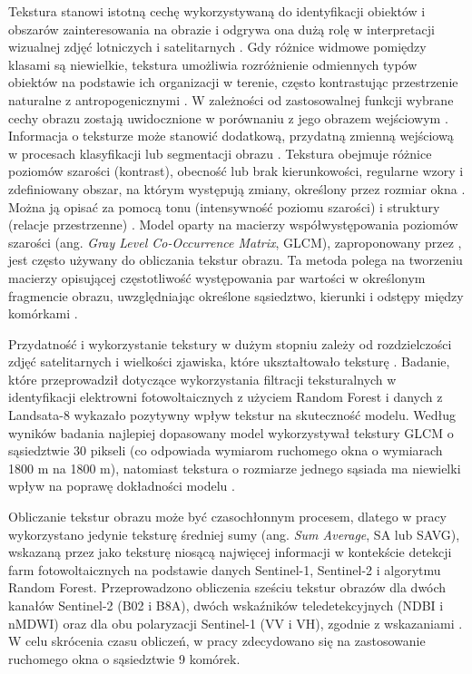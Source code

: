 \documentclass{amuthesis}
\begin{document}
Tekstura stanowi istotną cechę wykorzystywaną do identyfikacji obiektów
i obszarów zainteresowania na obrazie \autocite{haralick_1973_texture} i
odgrywa ona dużą rolę w interpretacji wizualnej zdjęć lotniczych i
satelitarnych \autocite{lewinski_2012_texture}. Gdy różnice widmowe
pomiędzy klasami są niewielkie, tekstura umożliwia rozróżnienie
odmiennych typów obiektów na podstawie ich organizacji w terenie, często
kontrastując przestrzenie naturalne z antropogenicznymi
\autocite{grass_r_texture}. W zależności od zastosowalnej funkcji
wybrane cechy obrazu zostają uwidocznione w porównaniu z jego obrazem
wejściowym \autocite{lewinski_2012_texture}. Informacja o teksturze może
stanowić dodatkową, przydatną zmienną wejściową w procesach klasyfikacji
lub segmentacji obrazu
\autocite{gong_1992_spatial_features,mumby_2002_ikonos}. Tekstura
obejmuje różnice poziomów szarości (kontrast), obecność lub brak
kierunkowości, regularne wzory i zdefiniowany obszar, na którym
występują zmiany, określony przez rozmiar okna
\autocite{hall_beyer_2017_glcm,grass_r_texture}. Można ją opisać za
pomocą tonu (intensywność poziomu szarości) i struktury (relacje
przestrzenne) \autocite{grass_r_texture}. Model oparty na macierzy
współwystępowania poziomów szarości (ang. \emph{Gray Level Co-Occurrence
Matrix}, GLCM), zaproponowany przez \textcite{haralick_1973_texture},
jest często używany do obliczania tekstur obrazu. Ta metoda polega na
tworzeniu macierzy opisującej częstotliwość występowania par wartości w
określonym fragmencie obrazu, uwzględniając określone sąsiedztwo,
kierunki i odstępy między komórkami \autocite{kupidura_2019_texture}.

Przydatność i wykorzystanie tekstury w dużym stopniu zależy od
rozdzielczości zdjęć satelitarnych i wielkości zjawiska, które
ukształtowało teksturę \autocite{grass_r_texture}. Badanie, które
przeprowadził \textcite{zhang_2021_texture} dotyczące wykorzystania
filtracji teksturalnych w identyfikacji elektrowni fotowoltaicznych z
użyciem Random Forest i danych z Landsata-8 wykazało pozytywny wpływ
tekstur na skuteczność modelu. Według wyników badania najlepiej
dopasowany model wykorzystywał tekstury GLCM o sąsiedztwie 30 pikseli
(co odpowiada wymiarom ruchomego okna o wymiarach 1800 m na 1800 m),
natomiast tekstura o rozmiarze jednego sąsiada ma niewielki wpływ na
poprawę dokładności modelu \autocite{zhang_2021_texture}.

Obliczanie tekstur obrazu może być czasochłonnym procesem, dlatego w
pracy wykorzystano jedynie teksturę średniej sumy (ang. \emph{Sum
Average}, SA lub SAVG), wskazaną przez \textcite{wang_2022_pv} jako
teksturę niosącą najwięcej informacji w kontekście detekcji farm
fotowoltaicznych na podstawie danych Sentinel-1, Sentinel-2 i algorytmu
Random Forest. Przeprowadzono obliczenia sześciu tekstur obrazów dla
dwóch kanałów Sentinel-2 (B02 i B8A), dwóch wskaźników teledetekcyjnych
(NDBI i nMDWI) oraz dla obu polaryzacji Sentinel-1 (VV i VH), zgodnie z
wskazaniami \textcite{wang_2022_pv}. W celu skrócenia czasu obliczeń, w
pracy zdecydowano się na zastosowanie ruchomego okna o sąsiedztwie 9
komórek.
\end{document}
